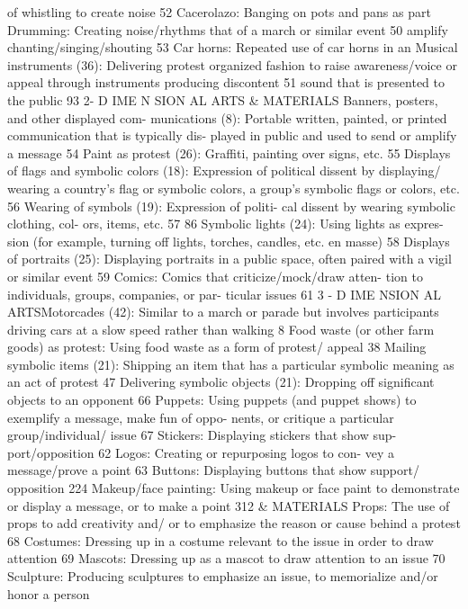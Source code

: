 \documentclass[twoside,a4paper,12pt,fleqn,openany]{extbook}
\begin{document}
 of whistling to create noise
 52
Cacerolazo: Banging on pots and pans as part
 Drumming: Creating noise/rhythms that
of a march or similar event
 50
 amplify chanting/singing/shouting
 53
Car horns: Repeated use of car horns in an
 Musical instruments (36): Delivering protest
organized fashion to raise awareness/voice
 or appeal through instruments producing
discontent
 51
 sound that is presented to the public
 93
2- D IME N SION AL ARTS & MATERIALS
Banners, posters, and other displayed com-
munications (8): Portable written, painted, or
printed communication that is typically dis-
played in public and used to send or amplify a
message
 54
Paint as protest (26): Graffiti, painting over
signs, etc.
 55
Displays of flags and symbolic colors (18):
Expression of political dissent by displaying/
wearing a country’s flag or symbolic colors, a
group’s symbolic flags or colors, etc.
 56
Wearing of symbols (19): Expression of politi-
cal dissent by wearing symbolic clothing, col-
ors, items, etc.
 57
86
Symbolic lights (24): Using lights as expres-
sion (for example, turning off lights, torches,
candles, etc. en masse)
 58
Displays of portraits (25): Displaying portraits
in a public space, often paired with a vigil or
similar event
 59
Comics: Comics that criticize/mock/draw atten-
tion to individuals, groups, companies, or par-
ticular issues
 61
3 - D IME NSION AL ARTSMotorcades (42): Similar to a march or parade
but involves participants driving cars at a slow
speed rather than walking
 8
Food waste (or other farm goods) as protest:
Using food waste as a form of protest/
appeal
 38
Mailing symbolic items (21): Shipping an item
that has a particular symbolic meaning as an
act of protest
 47
Delivering symbolic objects (21): Dropping off
significant objects to an opponent
 66
Puppets: Using puppets (and puppet shows)
to exemplify a message, make fun of oppo-
nents, or critique a particular group/individual/
issue
 67
Stickers: Displaying stickers that show sup-
port/opposition
 62
Logos: Creating or repurposing logos to con-
vey a message/prove a point
 63
Buttons: Displaying buttons that show support/
opposition
 224
Makeup/face painting: Using makeup or face
paint to demonstrate or display a message, or
to make a point
 312
& MATERIALS
Props: The use of props to add creativity and/
or to emphasize the reason or cause behind a
protest
 68
Costumes: Dressing up in a costume relevant
to the issue in order to draw attention
 69
Mascots: Dressing up as a mascot to draw
attention to an issue
 70
Sculpture: Producing sculptures to emphasize
an issue, to memorialize and/or honor a person
\end{document}
